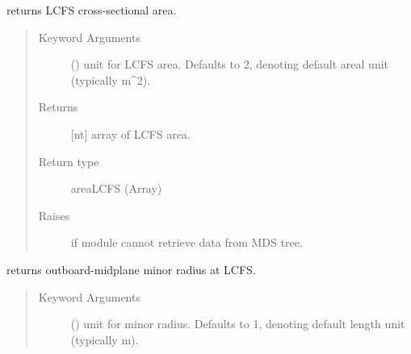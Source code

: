 \documentclass[letterpaper,10pt,english]{sphinxmanual}
\begin{document}
\begin{fulllineitems}
\begin{fulllineitems}
\end{fulllineitems}


\begin{fulllineitems}
\label{\detokenize{eqtools:eqtools.EFIT.EFITTree.getAreaLCFS}}
returns LCFS cross-sectional area.
\begin{quote}\begin{description}
\item[{Keyword Arguments}] \leavevmode
{} () \textendash{} unit for LCFS area.  Defaults to 2,
denoting default areal unit (typically m\textasciicircum{}2).

\item[{Returns}] \leavevmode
{[}nt{]} array of LCFS area.

\item[{Return type}] \leavevmode
areaLCFS (Array)

\item[{Raises}] \leavevmode
{} \textendash{} if module cannot retrieve data from MDS tree.

\end{description}\end{quote}

\end{fulllineitems}


\begin{fulllineitems}
\label{\detokenize{eqtools:eqtools.EFIT.EFITTree.getAOut}}
returns outboard-midplane minor radius at LCFS.
\begin{quote}\begin{description}
\item[{Keyword Arguments}] \leavevmode
{} () \textendash{} unit for minor radius.  Defaults to 1,
denoting default length unit (typically m).


\end{description}
\end{quote}
\end{fulllineitems}
\end{fulllineitems}
\end{document}
